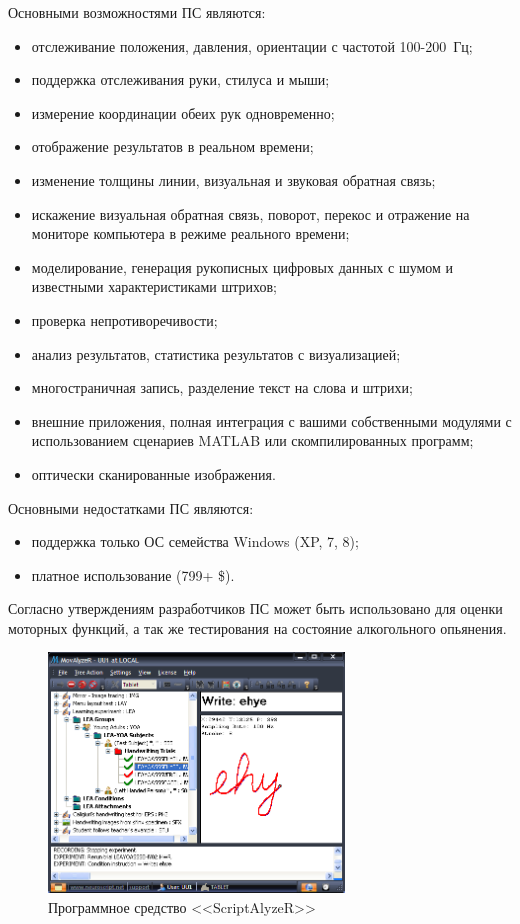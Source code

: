 Основными возможностями ПС являются:
\begin{itemize}
  \item отслеживание положения, давления, ориентации с частотой \mbox{100-200 Гц;}
	\item поддержка отслеживания руки, стилуса и мыши;
	\item измерение координации обеих рук одновременно;
	\item отображение результатов в реальном времени;
	\item изменение толщины линии, визуальная и звуковая обратная связь;
	\item искажение визуальная обратная связь, поворот, перекос и отражение на мониторе компьютера в режиме реального времени;
	\item моделирование, генерация рукописных цифровых данных с шумом и известными характеристиками штрихов;
	\item проверка непротиворечивости;
	\item анализ результатов, статистика результатов с визуализацией;
	\item многостраничная запись, разделение текст на слова и штрихи;
	\item внешние приложения, полная интеграция с вашими собственными модулями с использованием сценариев MATLAB или скомпилированных программ;
	\item оптически сканированные изображения.
\end{itemize}

Основными недостатками ПС являются:
\begin{itemize}
  \item поддержка только ОС семейства Windows (XP, 7, 8);
  \item платное использование (799+ \$).
\end{itemize}

Согласно утверждениям разработчиков ПС может быть использовано для оценки моторных функций, а так же тестирования на состояние алкогольного опьянения.

\begin{figure}[ht]
    \centering
    \includegraphics[width=0.7\textwidth]{figures/neuroscript.png}
    \caption{Программное средство <<ScriptAlyzeR>>}
    \label{fig:domain:analogs:neuro_script}
\end{figure}

